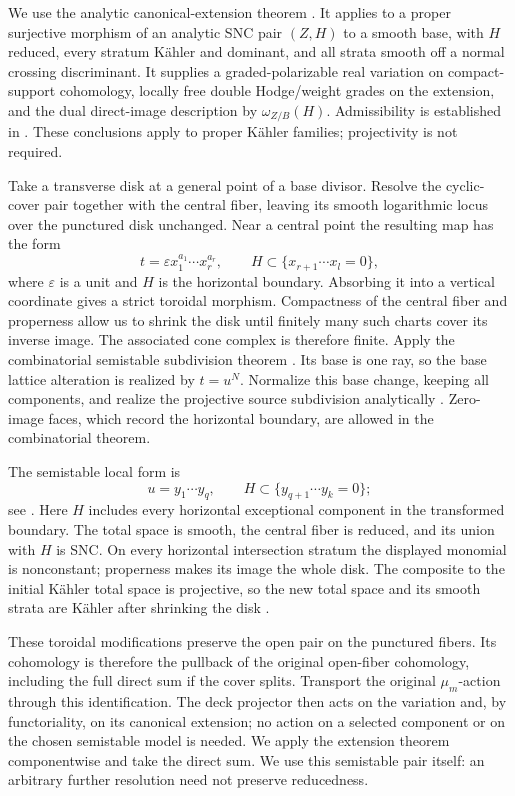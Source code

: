 We use the analytic canonical-extension theorem
\cite[Theorem~1.1]{FujinoFujisawaVMHS}.  It applies to a proper
surjective morphism of an analytic SNC pair $(Z,H)$ to a smooth base,
with $H$ reduced, every stratum K\"ahler and dominant, and all strata
smooth off a normal crossing discriminant.  It supplies a
graded-polarizable real variation on compact-support cohomology,
locally free double Hodge/weight grades on the extension, and the
dual direct-image description by $\omega_{Z/B}(H)$.  Admissibility
is established in \cite[Remark~4.8]{FujinoFujisawaVMHS}.
These conclusions apply to proper K\"ahler families; projectivity
is not required.

Take a transverse disk at a general point of a base divisor. Resolve
the cyclic-cover pair together with the central fiber, leaving its
smooth logarithmic locus over the punctured disk unchanged. Near a
central point the resulting map has the form
\[
 t=\varepsilon x_1^{a_1}\cdots x_r^{a_r},
 \qquad H\subset\{x_{r+1}\cdots x_l=0\},
\]
where $\varepsilon$ is a unit and $H$ is the horizontal boundary. Absorbing it
into a vertical coordinate gives a strict toroidal morphism. Compactness
of the central fiber and properness allow us to shrink the disk until
finitely many such charts cover its inverse image. The associated cone
complex is therefore finite. Apply the combinatorial semistable
subdivision theorem
\cite[Theorem~2.7]{AdiprasitoLiuTemkinSemistable}. Its base is one ray,
so the base lattice alteration is realized by $t=u^N$. Normalize this
base change, keeping all components, and realize the projective source
subdivision analytically
\cite[Lemmas~2.14--2.15, 2.18, and~2.31(4)]
{EnokizonoHashizumeSemistable}. Zero-image faces, which record the
horizontal boundary, are allowed in the combinatorial theorem.

The semistable local form is
\[
 u=y_1\cdots y_q,
 \qquad H\subset\{y_{q+1}\cdots y_k=0\};
\]
see \cite[Lemma~2.21(4)]{EnokizonoHashizumeSemistable}.
Here $H$ includes every horizontal exceptional component in the
transformed boundary. The total space is smooth, the central fiber is
reduced, and its union with $H$ is SNC. On every horizontal
intersection stratum the displayed monomial is nonconstant;
properness makes its image the whole disk. The composite to the
initial K\"ahler total space is projective, so the new total space and
its smooth strata are K\"ahler after shrinking the disk
\cite[Lemma~4.4]{FujikiDouady}.

These toroidal modifications preserve the open pair on the punctured
fibers. Its cohomology is therefore the pullback of the original
open-fiber cohomology, including the full direct sum if the cover
splits. Transport the original $\mu_m$-action through this
identification. The deck projector then acts on the variation and,
by functoriality, on its canonical extension; no action on a selected
component or on the chosen semistable model is needed. We apply the
extension theorem componentwise and take the direct sum. We use this
semistable pair itself: an arbitrary further resolution need not
preserve reducedness.

